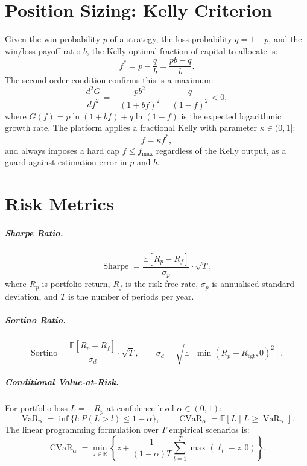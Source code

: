 \documentclass[12pt,openany]{book}
\numberwithin{equation}{chapter}
\theoremstyle{plain}
\theoremstyle{definition}
\theoremstyle{remark}
\DeclareMathOperator{\CVaR}{CVaR}
\DeclareMathOperator{\VaR}{VaR}
\DeclareMathOperator{\Sharpe}{Sharpe}
\begin{document}
\section{Position Sizing: Kelly Criterion}

Given the win probability $p$ of a strategy, the loss probability
$q = 1 - p$, and the win/loss payoff ratio $b$, the Kelly-optimal
fraction of capital to allocate is:
\begin{equation}
    f^* = p - \frac{q}{b} = \frac{pb - q}{b}.
    \label{eq:kelly}
\end{equation}
The second-order condition confirms this is a maximum:
\begin{equation}
    \frac{d^2G}{df^2} = -\frac{pb^2}{(1+bf)^2} - \frac{q}{(1-f)^2} < 0,
\end{equation}
where $G(f) = p \ln(1 + bf) + q\ln(1-f)$ is the expected logarithmic
growth rate. The platform applies a fractional Kelly with parameter
$\kappa \in (0,1]$:
\begin{equation}
    f = \kappa f^*,
\end{equation}
and always imposes a hard cap $f \leq f_{\max}$ regardless of the Kelly
output, as a guard against estimation error in $p$ and $b$.

\section{Risk Metrics}

\subparagraph{Sharpe Ratio.}
\begin{equation}
    \Sharpe = \frac{\mathbb{E}[R_p - R_f]}{\sigma_p} \cdot \sqrt{T},
\end{equation}
where $R_p$ is portfolio return, $R_f$ is the risk-free rate, $\sigma_p$
is annualised standard deviation, and $T$ is the number of periods per year.

\subparagraph{Sortino Ratio.}
\begin{equation}
    \text{Sortino} = \frac{\mathbb{E}[R_p - R_f]}{\sigma_d} \cdot \sqrt{T},
    \qquad
    \sigma_d = \sqrt{\mathbb{E}\!\left[\min(R_p - R_{\mathrm{tgt}}, 0)^2\right]}.
\end{equation}

\subparagraph{Conditional Value-at-Risk.}
For portfolio loss $L = -R_p$ at confidence level $\alpha \in (0,1)$:
\begin{equation}
    \VaR_\alpha = \inf\{l : P(L > l) \leq 1 - \alpha\},
    \qquad
    \CVaR_\alpha = \mathbb{E}[L \mid L \geq \VaR_\alpha].
\end{equation}
The linear programming formulation over $T$ empirical scenarios is:
\begin{equation}
    \CVaR_\alpha = \min_{z \in \mathbb{R}}
    \left\{
        z + \frac{1}{(1-\alpha)T} \sum_{t=1}^T \max(\ell_t - z, 0)
    \right\}.
    \label{eq:cvar_lp}
\end{equation}
\end{document}
